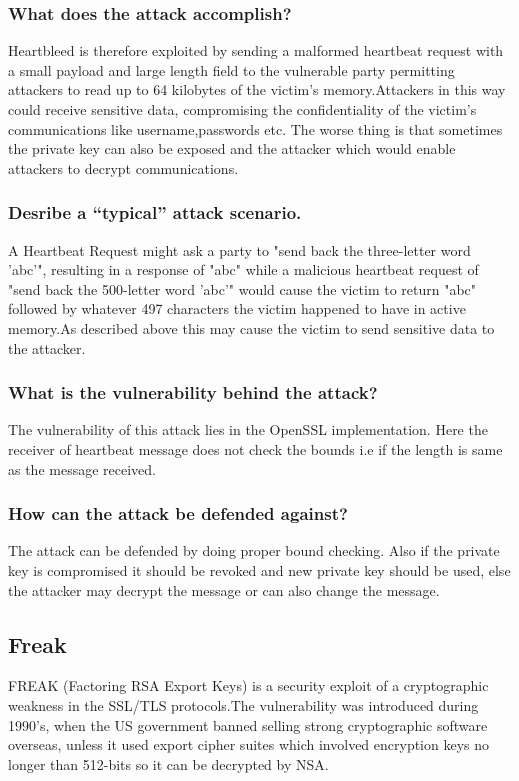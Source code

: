 \documentclass{article}
\begin{document}
\subsubsection{What does the attack accomplish?}
\indent \indent Heartbleed is therefore exploited by sending a malformed heartbeat request with a small payload and large length field to the vulnerable party permitting attackers to read up to 64 kilobytes of the victim's memory.Attackers in this way could receive sensitive data, compromising the confidentiality of the victim's communications like username,passwords etc. The worse thing is that sometimes the private key can also be exposed and the attacker which would enable attackers to decrypt communications.

\subsubsection{Desribe a “typical” attack scenario.}
\indent \indent A Heartbeat Request might ask a party to "send back the three-letter word 'abc'", resulting in a response of "abc" while a  malicious heartbeat request of "send back the 500-letter word 'abc'" would cause the victim to return "abc" followed by whatever 497 characters the victim happened to have in active memory.As described above this may cause the victim to send sensitive data to the attacker.

\subsubsection{What is the vulnerability behind the attack?}
\indent \indent The vulnerability of this attack lies in the OpenSSL implementation. Here the receiver of heartbeat message does not check the bounds i.e if the length is same as the message received.


\subsubsection{How can the attack be defended against?}
\indent \indent The attack can be defended by doing proper bound checking. Also if the private key is compromised it should be revoked and new private key should be used, else the attacker may decrypt the message or can also change the message.

\subsection{Freak}
\indent \indent FREAK (Factoring RSA Export Keys) is a security exploit of a cryptographic weakness in the SSL/TLS protocols.The vulnerability was introduced during 1990's, when the US government banned selling strong cryptographic software overseas, unless it used export cipher suites which involved encryption keys no longer than 512-bits so it can be decrypted by NSA.
\end{document}
